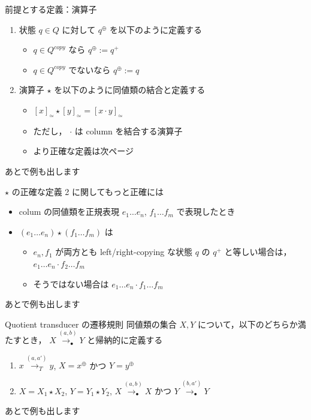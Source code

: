 \documentclass[presentation, xetex]{beamer}
\begin{document}
\begin{frame}[label={sec:orgdd5d52d}]{前提とする定義：演算子}
\begin{enumerate}
\item 状態 \(q \in Q\) に対して \(q^\oplus\) を以下のように定義する
\begin{itemize}
\item \(q \in Q^{copy}\) なら \(q^\oplus := q^+\)
\item \(q \in Q^{copy}\) でないなら \(q^\oplus := q\)
\end{itemize}

\item 演算子 \(\star\) を以下のように同値類の結合と定義する
\begin{itemize}
\item \([x]_\simeq \star [y]_\simeq = [x \cdot y]_\simeq\)
\item ただし， \(\cdot\) は column を結合する演算子
\item より正確な定義は次ページ
\end{itemize}
\end{enumerate}


あとで例も出します
\end{frame}


\begin{frame}[label={sec:orge27c9cf}]{\(\star\) の正確な定義}
2 に関してもっと正確には
\begin{itemize}
\item colum の同値類を正規表現 \(e_1 \dots e_n\), \(f_1 \dots f_m\) で表現したとき
\item \((e_1 \dots e_n) \star (f_1 \dots f_m)\) は
\begin{itemize}
\item \(e_n, f_1\) が両方とも left/right-copying な状態 \(q\) の \(q^+\)
と等しい場合は，
\(e_1 \dots e_n \cdot f_2 \dots f_m\)
\item そうではない場合は
\(e_1 \dots e_n \cdot f_1 \dots f_m\)
\end{itemize}
\end{itemize}


あとで例も出します
\end{frame}


\begin{frame}[label={sec:orge6546b9}]{Quotient transducer の遷移規則}
同値類の集合 \(X, Y\) について，以下のどちらか満たすとき，
\(X \overset{(a, b)}{\longrightarrow_\bullet} Y\) と帰納的に定義する
\begin{enumerate}
\item \(x \overset{(a, a')}{\longrightarrow_T} y\),
\(X = x^\oplus\) かつ \(Y = y^\oplus\)
\item \(X = X_1 \star X_2\), \(Y = Y_1 \star Y_2\),
\(X \overset{(a, b)}{\longrightarrow_\bullet} X\) かつ
\(Y \overset{(b, a')}{\longrightarrow_\bullet} Y\)
\end{enumerate}


あとで例も出します
\end{frame}
\end{document}
